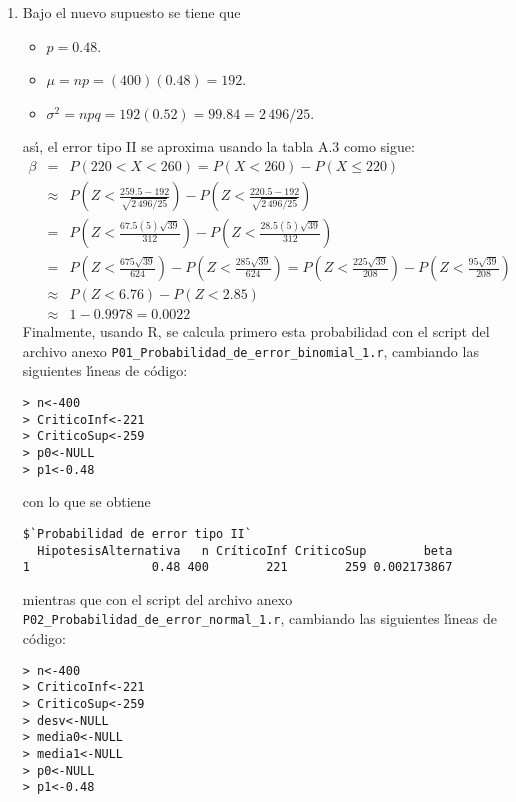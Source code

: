 \begin{solucion}
\begin{enumerate}
  \item Bajo el nuevo supuesto se tiene que
  \begin{itemize}
   \item $p = 0.48$.
   \item $\mu = np = (400)(0.48) = 192$.
   \item $\sigma^2 = npq = 192(0.52) = 99.84 = 2\,496/25$.
  \end{itemize}
  as\'{\i}, el error tipo II se aproxima usando la tabla A.3 como sigue:
  \begin{eqnarray*}
   \beta & = & P(220 < X < 260) = P(X < 260) - P(X \leq 220) \\
   & \approx & P\left( Z < \frac{259.5 - 192}{\sqrt{2\,496/25}} \right) - P\left( Z < \frac{220.5 - 192}{\sqrt{2\,496/25}} \right) \\
   & = & P\left( Z < \frac{67.5(5)\sqrt{39}}{312} \right) - P\left( Z < \frac{28.5(5)\sqrt{39}}{312} \right) \\
   & = & P\left( Z < \frac{675\sqrt{39}}{624} \right) - P\left( Z < \frac{285\sqrt{39}}{624} \right) = P\left( Z < \frac{225\sqrt{39}}{208} \right) - P\left( Z < \frac{95\sqrt{39}}{208} \right) \\
   & \approx & P(Z < 6.76) - P(Z < 2.85) \\
   & \approx & 1 - 0.9978 = 0.0022
  \end{eqnarray*}
  Finalmente, usando R, se calcula primero esta probabilidad con el script del archivo anexo \texttt{P01\_Probabilidad\_de\_error\_binomial\_1.r}, cambiando las siguientes l\'{\i}neas de c\'odigo:
  \begin{verbatim}
> n<-400
> CriticoInf<-221
> CriticoSup<-259
> p0<-NULL
> p1<-0.48
  \end{verbatim}
  \vspace{-0.5cm}
  con lo que se obtiene
  \begin{verbatim}
$`Probabilidad de error tipo II`
  HipotesisAlternativa   n CríticoInf CriticoSup        beta
1                 0.48 400        221        259 0.002173867
  \end{verbatim}
  \vspace{-0.5cm}
  mientras que con el script del archivo anexo \texttt{P02\_Probabilidad\_de\_error\_normal\_1.r}, cambiando las siguientes l\'{\i}neas de c\'odigo:
  \begin{verbatim}
> n<-400
> CriticoInf<-221
> CriticoSup<-259
> desv<-NULL
> media0<-NULL
> media1<-NULL
> p0<-NULL
> p1<-0.48
  \end{verbatim}
  \vspace{-0.5cm}

\end{enumerate}
\end{solucion}
